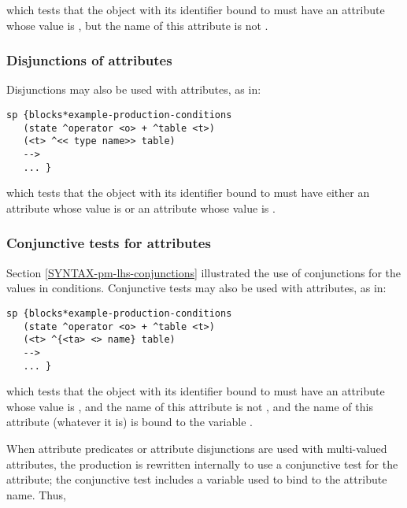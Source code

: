 which tests that the object with its identifier bound to  must have an attribute whose value is , but the name of this attribute is not .

\subsubsection*{Disjunctions of attributes}
\index{<< >>}

Disjunctions may also be used with attributes, as in:

\begin{verbatim}
sp {blocks*example-production-conditions
   (state ^operator <o> + ^table <t>)
   (<t> ^<< type name>> table)
   -->
   ... }
\end{verbatim}

which tests that the object with its identifier bound to  must have either an attribute  whose value is  or an attribute  whose value is .

\subsubsection*{Conjunctive tests for attributes}

Section \ref{SYNTAX-pm-lhs-conjunctions} illustrated the use of conjunctions for the values in conditions. Conjunctive tests may also be used with attributes, as in:

\begin{verbatim}
sp {blocks*example-production-conditions
   (state ^operator <o> + ^table <t>)
   (<t> ^{<ta> <> name} table)
   -->
   ... }
\end{verbatim}

which tests that the object with its identifier bound to  must have an attribute whose value is , and the name of this attribute is not , and the name of this attribute (whatever it is) is bound to the variable .

When attribute predicates or attribute disjunctions are used with multi-valued attributes, the production is rewritten internally to use a conjunctive test for the attribute; the conjunctive test includes a variable used to bind to the attribute name. Thus,

